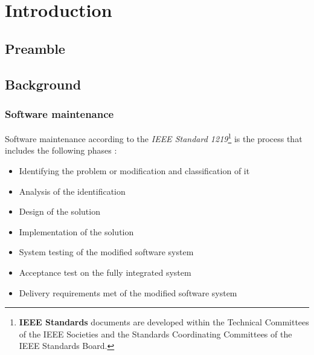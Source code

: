 \chapter{Introduction}
\label{chap:1}

\section{Preamble}

\section{Background}

\subsection{Software maintenance}
Software maintenance according to the \textit{IEEE Standard 1219}\footnote{\textbf{IEEE Standards} documents are developed within the Technical Committees of the IEEE Societies and the Standards Coordinating Committees of the IEEE Standards Board.} is the process that includes the following phases \cite{Mamone1994, Hasan2012}:
\begin{itemize}
    \item Identifying the problem or modification and classification of it
    \item Analysis of the identification
    \item Design of the solution
    \item Implementation of the solution
    \item System testing of the modified software system
    \item Acceptance test on the fully integrated system
    \item Delivery requirements met of the modified software system
\end{itemize}

